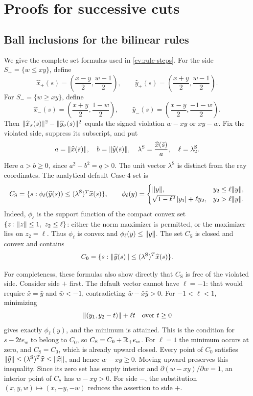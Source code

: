 \section{Proofs for successive cuts}\label{cv:appendix}

\subsection{Ball inclusions for the bilinear rules}\label{cv:ball-proofs}

We give the complete set formulas used in \cref{cv:rule-steps}. For the
side $S_+=\{w\le xy\}$, define
\[
 \widehat x_+(s)=\left(\frac{x-y}{2},\frac{w+1}{2}\right),\qquad
 \widehat y_+(s)=\left(\frac{x+y}{2},\frac{w-1}{2}\right).
\]
For $S_-=\{w\ge xy\}$, define
\[
 \widehat x_-(s)=\left(\frac{x+y}{2},\frac{1-w}{2}\right),\qquad
 \widehat y_-(s)=\left(\frac{x-y}{2},\frac{-1-w}{2}\right).
\]
Then $\lVert\widehat x_\sigma(s)\rVert^2-
\lVert\widehat y_\sigma(s)\rVert^2$ equals the signed violation
$w-xy$ or $xy-w$. Fix the violated side, suppress its subscript, and put
\[
 a=\lVert\widehat x(\bar s)\rVert,\quad
 b=\lVert\widehat y(\bar s)\rVert,\quad
 \lambda^{\mathrm S}=\frac{\widehat x(\bar s)}{a},\quad
 \ell=\lambda^{\mathrm S}_2.
\]
Here $a>b\ge0$, since $a^2-b^2=q>0$.
The unit vector $\lambda^{\mathrm S}$ is distinct from the ray coordinates.
The analytical default Case-4 set is
\begin{equation}\label{cv:scip-definition}
 C_{\mathrm S}=\{s:\phi_\ell(\widehat y(s))
                            \le(\lambda^{\mathrm S})^T\widehat x(s)\},
 \qquad
 \phi_\ell(y)=
 \begin{cases}
 \lVert y\rVert,&y_2\le\ell\lVert y\rVert,\\
 \sqrt{1-\ell^2}\,\lvert y_1\rvert+\ell y_2,&y_2>\ell\lVert y\rVert.
 \end{cases}
\end{equation}
Indeed, $\phi_\ell$ is the support function of the compact convex set
$\{z:\lVert z\rVert\le1,\ z_2\le\ell\}$: either the norm maximizer is
permitted, or the maximizer lies on $z_2=\ell$. Thus $\phi_\ell$ is
convex and $\phi_\ell(y)\le\lVert y\rVert$. The set $C_{\mathrm S}$ is closed
and convex and contains
\[
 C_0=\{s:\lVert\widehat y(s)\rVert
                        \le(\lambda^{\mathrm S})^T\widehat x(s)\}.
\]

For completeness, these formulas also show directly that
$C_{\mathrm S}$ is free of the violated side. Consider side $+$ first.
The default vector cannot have $\ell=-1$: that would require
$\bar x=\bar y$ and $\bar w<-1$, contradicting
$\bar w-\bar x\bar y>0$. For $-1<\ell<1$, minimizing
\[
 \lVert(y_1,y_2-t)\rVert+\ell t\quad\hbox{over }t\ge0
\]
gives exactly $\phi_\ell(y)$, and the minimum is attained. This is the
condition for $s-2te_w$ to belong to $C_0$, so
$C_{\mathrm S}=C_0+\mathbb R_+ e_w$. For $\ell=1$ the minimum occurs at zero,
and $C_{\mathrm S}=C_0$, which is already upward closed. Every point of
$C_0$ satisfies
$\lVert\widehat y\rVert\le(\lambda^{\mathrm S})^T\widehat x
\le\lVert\widehat x\rVert$, and hence $w-xy\ge0$.
Moving upward preserves this inequality. Since its zero set has empty
interior and $\partial(w-xy)/\partial w=1$, an interior point of
$C_{\mathrm S}$ has $w-xy>0$. For side $-$, the substitution
$(x,y,w)\mapsto(x,-y,-w)$ reduces the assertion to side $+$.

